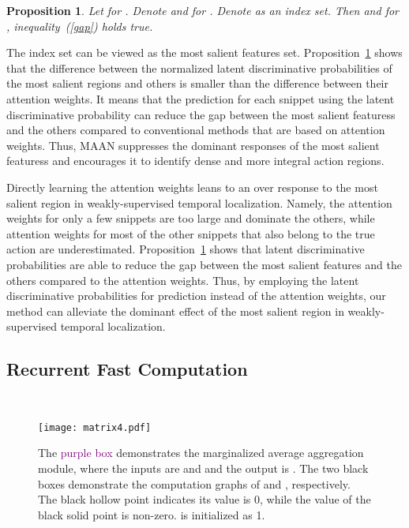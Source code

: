 \documentclass{article} \usepackage{iclr2019_conference,times}
\newtheorem{proposition}{Proposition}
\begin{document}
\begin{proposition}
\label{Re}
Let    for . Denote  and   for .  Denote  as an index set. Then    and for ,    inequality~(\ref{gap}) holds true. 
\end{proposition}
The index set  can be viewed as the most salient features set.  Proposition~\ref{Re} shows that the difference between the normalized latent discriminative probabilities of the most salient regions and others is smaller than the difference between their attention weights. It means that the prediction for each snippet using the latent discriminative probability can reduce the gap between the most salient featuress and the others compared to conventional methods that are based on attention weights. Thus, MAAN suppresses the dominant responses of the most salient featuress and encourages it to identify dense and more integral action regions.  


Directly learning the attention weights  leans to an over response to the most salient region in weakly-supervised temporal localization. Namely, the attention weights for only a few snippets are too large and dominate the others, while attention weights for most of the other snippets that also belong to the true action are underestimated. Proposition~\ref{Re} shows that latent discriminative probabilities are able to reduce the gap between the most salient features and the others compared to the attention weights. Thus, by employing the latent discriminative probabilities for prediction instead of the attention weights, our method can alleviate the dominant effect of the most salient region in weakly-supervised temporal localization. 






\subsection{Recurrent Fast Computation} ~\label{FastComputation}

  \begin{figure}[!t]
  	\begin{center}
  		\texttt{[image: matrix4.pdf]}
  		\vspace{-3mm}
  		\caption{{The \textcolor{purple}{purple box} demonstrates the marginalized average aggregation module, where the inputs are  and  and the output is . The two black boxes demonstrate the computation graphs of  and , respectively. The black hollow point indicates its value is 0, while the value of the black solid point is non-zero.  is initialized as 1.}}
  		\label{fig:graph}
  		\vspace{-2mm}
  	\end{center}
  \end{figure}
  \vspace{-2mm}
\end{document}
